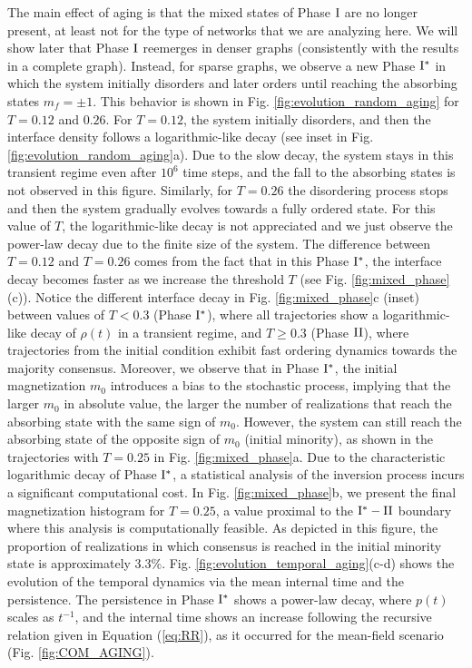 The main effect of aging is that the mixed states of Phase ${\rm I}$ are no longer present, at least not for the type of networks that we are analyzing here. We will show later that Phase ${\rm I}$ reemerges in denser graphs (consistently with the results in a complete graph). Instead, for sparse graphs, we observe a new Phase ${\rm I}^{*}$ in which the system initially disorders and later orders until reaching the absorbing states $m_f = \pm 1$. This behavior is shown in Fig. \ref{fig:evolution_random_aging} for $T = 0.12$ and $0.26$. For $T = 0.12$, the system initially disorders, and then the interface density follows a logarithmic-like decay (see inset in Fig. \ref{fig:evolution_random_aging}a). Due to the slow decay, the system stays in this transient regime even after $10^{6}$ time steps, and the fall to the absorbing states is not observed in this figure. Similarly, for $T = 0.26$ the disordering process stops and then the system gradually evolves towards a fully ordered state. For this value of $T$, the logarithmic-like decay is not appreciated and we just observe the power-law decay due to the finite size of the system. The difference between $T = 0.12$ and $T = 0.26$ comes from the fact that in this Phase ${\rm I}^{*}$, the interface decay becomes faster as we increase the threshold $T$ (see Fig. \ref{fig:mixed_phase}(c)). Notice the different interface decay in Fig. \ref{fig:mixed_phase}c (inset) between values of $T < 0.3$ (Phase ${\rm I}^{*}$), where all trajectories show a logarithmic-like decay of $\rho(t)$ in a transient regime, and $T \geq 0.3$ (Phase ${\rm II}$), where trajectories from the initial condition exhibit fast ordering dynamics towards the majority consensus. Moreover, we observe that in Phase ${\rm I}^{*}$, the initial magnetization $m_0$ introduces a bias to the stochastic process, implying that the larger $m_0$ in absolute value, the larger the number of realizations that reach the absorbing state with the same sign of $m_0$. However, the system can still reach the absorbing state of the opposite sign of $m_0$ (initial minority), as shown in the trajectories with $T = 0.25$ in Fig. \ref{fig:mixed_phase}a. Due to the characteristic logarithmic decay of Phase ${\rm I}^{*}$, a statistical analysis of the inversion process incurs a significant computational cost. In Fig. \ref{fig:mixed_phase}b, we present the final magnetization histogram for $T=0.25$, a value proximal to the ${\rm I}^{*} - {\rm II}$ boundary where this analysis is computationally feasible. As depicted in this figure, the proportion of realizations in which consensus is reached in the initial minority state is approximately $3.3\%$. Fig. \ref{fig:evolution_temporal_aging}(c-d) shows the evolution of the temporal dynamics via the mean internal time and the persistence. The persistence in Phase ${\rm I}^{*}$ shows a power-law decay, where $p(t)$ scales as $t^{-1}$, and the internal time shows an increase following the recursive relation given in Equation (\ref{eq:RR}), as it occurred for the mean-field scenario (Fig. \ref{fig:COM_AGING}).


